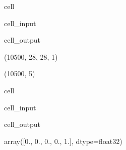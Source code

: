 \documentclass[letterpaper,10pt,english]{jupyterBook}
\begin{document}
\begin{sphinxuseclass}{cell}\begin{sphinxVerbatimInput}

\begin{sphinxuseclass}{cell_input}
\begin{sphinxVerbatim}[commandchars=\\\{\}]
\end{sphinxVerbatim}

\end{sphinxuseclass}\end{sphinxVerbatimInput}
\begin{sphinxVerbatimOutput}

\begin{sphinxuseclass}{cell_output}
\begin{sphinxVerbatim}[commandchars=\\\{\}]
(10500, 28, 28, 1)
\end{sphinxVerbatim}

\begin{sphinxVerbatim}[commandchars=\\\{\}]
(10500, 5)
\end{sphinxVerbatim}

\end{sphinxuseclass}\end{sphinxVerbatimOutput}

\end{sphinxuseclass}
\begin{sphinxuseclass}{cell}\begin{sphinxVerbatimInput}

\begin{sphinxuseclass}{cell_input}
\begin{sphinxVerbatim}[commandchars=\\\{\}]
\PYG{p}{[}\PYG{p}{]}
\end{sphinxVerbatim}

\end{sphinxuseclass}\end{sphinxVerbatimInput}
\begin{sphinxVerbatimOutput}

\begin{sphinxuseclass}{cell_output}
\begin{sphinxVerbatim}[commandchars=\\\{\}]
array([0., 0., 0., 0., 1.], dtype=float32)
\end{sphinxVerbatim}

\end{sphinxuseclass}\end{sphinxVerbatimOutput}

\end{sphinxuseclass}
\end{document}
